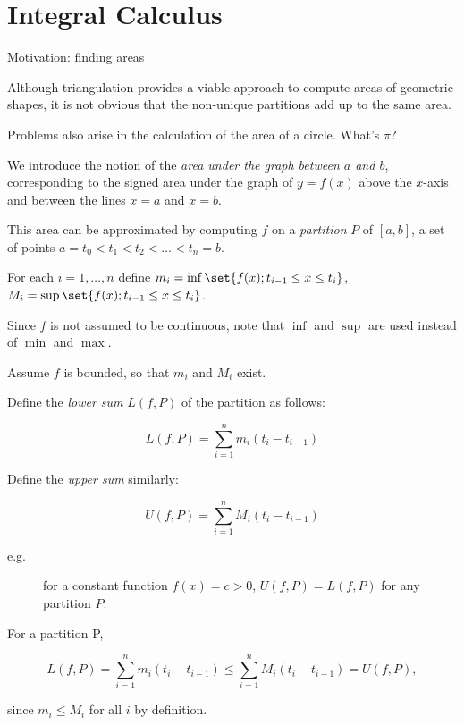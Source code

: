 \documentclass[11pt]{scrartcl}
\begin{document}
\section*{Integral Calculus}
\label{sec:intcalc}

Motivation: finding areas

Although triangulation provides a viable approach to compute areas of
geometric shapes, it is not obvious that the non-unique partitions add
up to the same area.

Problems also arise in the calculation of the area of a circle. What's
\(\pi\)?

We introduce the notion of the \emph{area under the graph between
  \(a\) and \(b\)}, corresponding to the signed area under the graph
of \(y = f(x)\) above the \(x\)-axis and between the lines \(x=a\) and
\(x=b\).

This area can be approximated by computing \(f\) on a \emph{partition} \(P\)
of \([a, b]\), a set of points
\(a = t_{0} < t_{1} < t_{2} < \dots < t_{n} = b\).

For each \(i = 1, \dots , n\) define
\(m_{i} = \inf \set{f(x); t_{i-1} \leq x \leq t_{i}}\),
\(M_{i} = \sup\set{f(x); t_{i-1} \leq x \leq t_{i}}\).

\begin{note*}
  Since \(f\) is not assumed to be continuous, note that \(\inf\) and
  \(\sup\) are used instead of \(\min\) and \(\max\).
\end{note*}

Assume \(f\) is bounded, so that \(m_{i}\) and \(M_{i}\) exist.

Define the \emph{lower sum} \(L(f, P)\) of the partition as follows:

\begin{equation*}
  L(f, P) = \sum_{i=1}^{n}m_{i}(t_{i} - t_{i-1})
\end{equation*}

Define the \emph{upper sum} similarly:

\begin{equation*}
  U(f, P) = \sum_{i=1}^{n}M_{i}(t_{i} - t_{i-1})
\end{equation*}

\begin{description}

\item[e.g.] for a constant function \(f(x) = c > 0\),
  \(U(f, P) = L(f, P)\) for any partition \(P\).

\end{description}

\begin{note*}

For a partition P,

  \begin{equation*}
    L(f, P) = \sum_{i=1}^{n}m_{i}(t_{i} - t_{i-1}) \leq \sum_{i=1}^{n}M_{i}(t_{i} - t_{i-1}) = U(f, P),
  \end{equation*}

  since \(m_{i} \leq M_{i}\) for all \(i\) by definition.
\end{note*}
\end{document}

